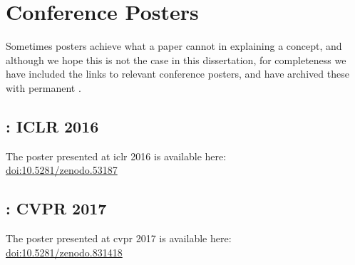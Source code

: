 \documentclass[thesis]{subfiles}
\begin{document}

\chapter{Conference Posters}
\label{posters}
Sometimes posters achieve what a paper cannot in explaining a concept, and although we hope this is not the case in this dissertation, for completeness we have included the links to relevant conference posters, and have archived these with permanent .
\section*{: ICLR 2016}
The poster presented at \gls{iclr} 2016 is available here:\\
\href{https://doi.org/10.5281/zenodo.53187}{doi:10.5281/zenodo.53187}
\if@print
\else
    \afterpage{}
\fi
\section*{: CVPR 2017}
The poster presented at \gls{cvpr} 2017 is available here:\\
\href{https://doi.org/10.5281/zenodo.831418}{doi:10.5281/zenodo.831418}
\if@print
\else
    \afterpage{}
\fi
\end{document}
